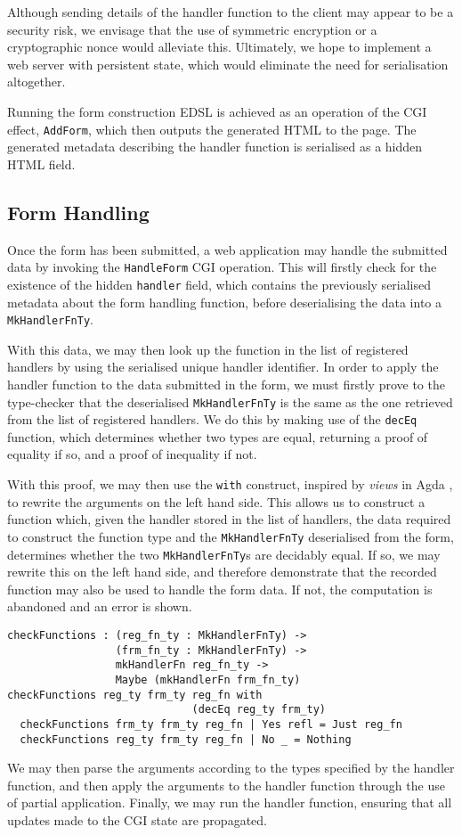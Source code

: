 \documentclass[preprint]{sigplanconf}
\begin{document}
Although sending details of the handler function to the client may appear to be a security risk, we envisage that the use of symmetric encryption or a cryptographic nonce would alleviate this. Ultimately, we hope to implement a web server with persistent state, which would eliminate the need for serialisation altogether.

Running the form construction EDSL is achieved as an operation of the CGI effect, \texttt{AddForm}, which then outputs the generated HTML to the page. The generated metadata describing the handler function is serialised as a hidden HTML field.

\subsection{Form Handling}
Once the form has been submitted, a web application may handle the submitted data by invoking the \texttt{HandleForm} CGI operation. This will firstly check for the existence of the hidden \texttt{handler} field, which contains the previously serialised metadata about the form handling function, before deserialising the data into a \texttt{MkHandlerFnTy}. 

With this data, we may then look up the function in the list of registered handlers by using the serialised unique handler identifier. In order to apply the handler function to the data submitted in the form, we must firstly prove to the type-checker that the deserialised \texttt{MkHandlerFnTy} is the same as the one retrieved from the list of registered handlers. We do this by making use of the \texttt{decEq} function, which determines whether two types are equal, returning a proof of equality if so, and a proof of inequality if not.

With this proof, we may then use the \texttt{with} construct, inspired by \textit{views} in Agda \cite{viewfromleft}, to rewrite the arguments on the left hand side. This allows us to construct a function which, given the handler stored in the list of handlers, the data required to construct the function type and the \texttt{MkHandlerFnTy} deserialised from the form, determines whether the two \texttt{MkHandlerFnTy}s are decidably equal. If so, we may rewrite this on the left hand side, and therefore demonstrate that the recorded function may also be used to handle the form data. If not, the computation is abandoned and an error is shown. %
{\small
\begin{verbatim}
checkFunctions : (reg_fn_ty : MkHandlerFnTy) -> 
                 (frm_fn_ty : MkHandlerFnTy) -> 
                 mkHandlerFn reg_fn_ty -> 
                 Maybe (mkHandlerFn frm_fn_ty)
checkFunctions reg_ty frm_ty reg_fn with 
                             (decEq reg_ty frm_ty)
  checkFunctions frm_ty frm_ty reg_fn | Yes refl = Just reg_fn
  checkFunctions reg_ty frm_ty reg_fn | No _ = Nothing
\end{verbatim}}
We may then parse the arguments according to the types specified by the handler function, and then apply the arguments to the handler function through the use of partial application. Finally, we may run the handler function, ensuring that all updates made to the CGI state are propagated.
\end{document}
